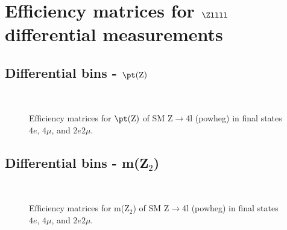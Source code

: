 \section{Efficiency matrices for \texorpdfstring{$\Zllll$}{Z to 4l} differential measurements}
\label{z4lefficiency}
 

\subsection{Differential bins - $\pt({\rm Z})$}

\begin{figure}[!h!tb]
  \begin{center}
    \\
    \caption{ Efficiency matrices for $\pt({\rm Z})$ of SM Z$\to$4l ({\sc powheg}) in final states $4e$, $4\mu$, and $2e2\mu$. }
    \label{fig:z4l-eff-pT4l}
  \end{center}
\end{figure} \clearpage

\subsection{Differential bins -  m(Z$_2$) }

\begin{figure}[!h!tb]
  \begin{center}
    \\
    \caption{ Efficiency matrices for m(Z$_2$) of SM Z$\to$4l ({\sc powheg}) in final states $4e$, $4\mu$, and $2e2\mu$. }
    \label{fig:z4l-eff-mz2}
  \end{center}
\end{figure} \clearpage


